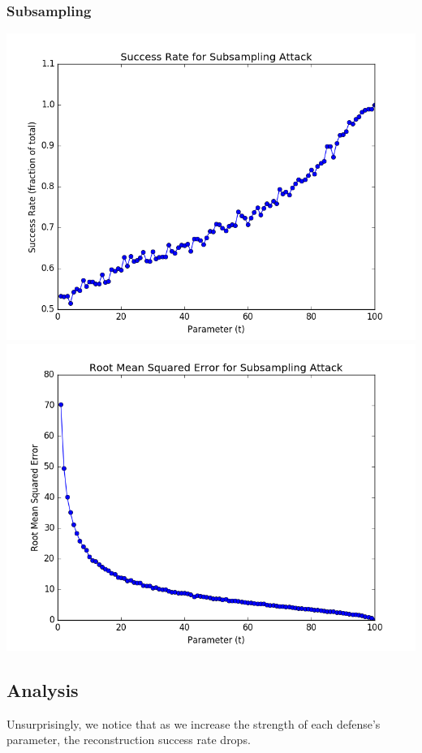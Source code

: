 \documentclass[12pt]{article}
\begin{document}
\subsubsection{Subsampling}
\includegraphics[scale=0.4]{figures/problem_2_subsampling_success_rate.png} \includegraphics[scale=0.4]{figures/problem_2_subsampling_error.png} 

\subsection{Analysis}

\noindent

Unsurprisingly, we notice that as we increase the strength of each defense's parameter, the reconstruction success rate drops.
\end{document}

